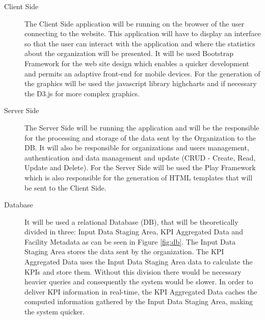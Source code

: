 \begin{description}
	\item  [Client Side] The Client Side application will be running on the browser of the user connecting to the website. This application will have to display an interface so that the user can interact with the application and where the statistics about the organization will be presented. It will be used  Bootstrap Framework for the web site design which enables a quicker development and permits an adaptive front-end for mobile devices. For the generation of the graphics will be used the javascript library highcharts and if necessary the D3.js for more complex graphics.\\

	\item [Server Side] The Server Side will be running the application and will be the responsible for the processing and storage of the data sent by the Organization to the DB. It will also be responsible for organizations and users management, authentication and data management and update (CRUD - Create, Read, Update and Delete). For the Server Side will be used the Play Framework which is also responsible for the generation of HTML templates that will be sent to the Client Side.\\

	\item [Database] It will be used a relational Database (DB), that will be theoretically divided in three: Input Data Staging Area, KPI Aggregated Data and Facility Metadata as can be seen in Figure \ref{fig:db}. The Input Data Staging Area stores the data sent by the organization. The KPI Aggregated Data uses the Input Data Staging Area data to calculate the KPIs and store them.
	Without this division there would be necessary heavier queries and consequently the system would be slower. In order to deliver KPI information in real-time, the KPI Aggregated Data caches the computed information gathered by the Input Data Staging Area, making the system quicker.

\end{description}

